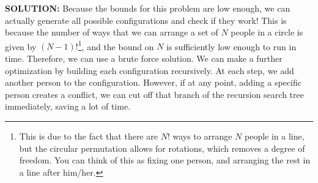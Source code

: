 \textbf{SOLUTION:}
\blank
Because the bounds for this problem are low enough, we can actually generate all possible configurations and check if they work!  This is because the number of ways that we can arrange a set of $N$ people in a circle is given by $(N-1)!$\footnote{This is due to the fact that there are $N!$ ways to arrange $N$ people in a line, but the circular permutation allows for rotations, which removes a degree of freedom.  You can think of this as fixing one person, and arranging the rest in a line after him/her.}, and the bound on $N$ is sufficiently low enough to run in time.  Therefore, we can use a brute force solution.
\blank
We can make a further optimization by building each configuration recursively.  At each step, we add another person to the configuration.  However, if at any point, adding a specific person creates a conflict, we can cut off that branch of the recursion search tree immediately, saving a lot of time.